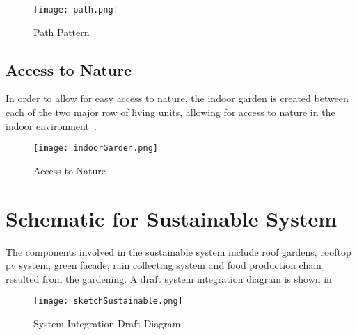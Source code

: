 \begin{figure}[htbp]
  \centering
  \texttt{[image: path.png]}
  \caption[Path Pattern]{Path Pattern}
  \label{fig:path}
\end{figure}

\subsection{Access to Nature}
In order to allow for easy access to nature, the indoor garden is
created between each of the two major row of living units, allowing
for access to nature in the indoor
environment~.
\begin{figure}[htbp]
  \centering
  \texttt{[image: indoorGarden.png]}
  \caption[Access to Nature]{Access to Nature}
  \label{fig:indoorGarden}
\end{figure}
\section{Schematic for Sustainable System}
The components involved in the sustainable system include roof
gardens, rooftop pv system, green facade, rain collecting system and
food production chain resulted from the gardening. A draft system
integration diagram is shown in 
\begin{figure}[h!]
  \centering
  \texttt{[image: sketchSustainable.png]}
  \caption[System Integration Draft Diagram]{System Integration Draft
    Diagram}
  \label{fig:sketchSustainable}
\end{figure}